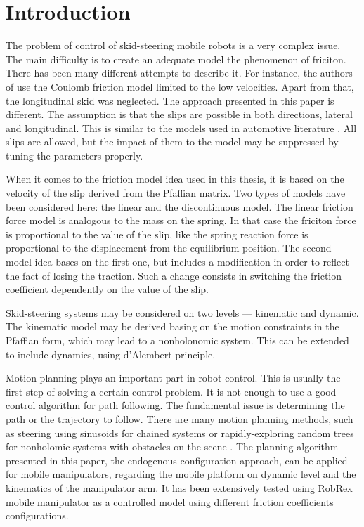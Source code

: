 \chapter{Introduction}
The problem of control of skid-steering mobile robots is a very complex issue. 
The main difficulty is to create an adequate model the phenomenon of friciton. 
There has been many different attempts to describe it.
For instance, the authors of \cite{caracciolo1999trajectory} use the Coulomb friction model limited to the low velocities.
Apart from that, the longitudinal skid was neglected. The approach presented in this paper is different.
The assumption is that the slips are possible in both directions, lateral and longitudinal.
This is similar to the models used in automotive literature \cite{pacejka2005tyre}.
All slips are allowed, but the impact of them to the model may be suppressed by tuning the
parameters properly. 

When it comes to the friction model idea used in this thesis,
it is based on the velocity of the slip derived
from the Pfaffian matrix. %
Two types of models have been considered here: the linear and the discontinuous model.
The linear friction force model is analogous to the mass on the spring. In that case the friciton
force is proportional to the value of the slip, like the spring reaction force is proportional
to the displacement from the equilibrium position. The second model idea bases on the first one,
but includes a modification in order to reflect the fact of losing the traction. Such a change
consists in switching the friction coefficient dependently on the value of the slip.

Skid-steering systems may be considered on two levels --- kinematic and dynamic.
The kinematic model may be derived basing on the motion constraints in the Pfaffian form, which may lead
to a nonholonomic system. This can be extended to include dynamics, using d'Alembert principle.

Motion planning plays an important part in robot control. This is usually the first step of solving
a certain control problem. It is not enough to use a good control algorithm for path following. The fundamental
issue is determining the path or the trajectory to follow. There are many motion planning methods,
such as steering using sinusoids for chained systems \cite{murray1993nonholonomic} or rapidly-exploring random trees for nonholomic systems
with obstacles on the scene \cite{lavalle2000rapidly}. The planning algorithm presented in this paper,
the endogenous configuration approach, can be applied for mobile manipulators, regarding the
mobile platform on dynamic level and the kinematics of the manipulator arm. It has been extensively
tested using RobRex mobile manipulator as a controlled model using different
friction coefficients configurations.

